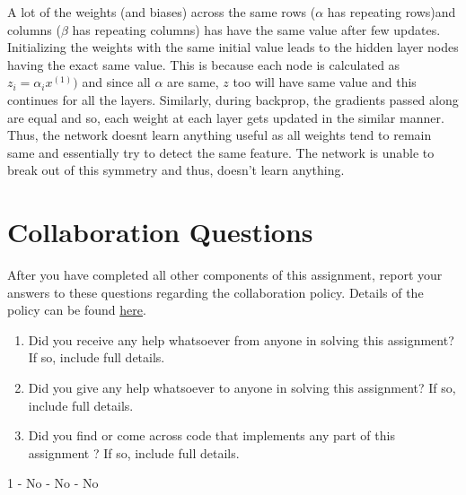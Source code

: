 \documentclass[11pt,addpoints,answers]{exam}
\begin{document}
\begin{questions}
\begin{parts}
\begin{your_solution}[title=Answer,height=5cm,width=14.5cm]
\vspace{-3pt}
A lot of the weights (and biases) across the same rows ($\alpha$ has repeating rows)and columns ($\beta$ has repeating columns) has  have the same value after few updates. Initializing the weights with the same initial value leads to the hidden layer nodes having the exact same value. This is because each node is calculated as $z_i = \alpha_i x^{(1)})$ and since all $\alpha$ are same, $z$ too will have same value and this continues for all the layers. Similarly, during backprop, the gradients passed along are equal and so, each weight at each layer gets updated in the similar manner. Thus, the network doesnt learn anything useful as all weights tend to remain same and essentially try to detect the same feature. The network is unable to break out of this symmetry and thus, doesn't learn anything.
\end{your_solution}

\end{parts}

\end{questions}



\newpage

\section{Collaboration Questions}
After you have completed all other components of this assignment, report your answers to these questions regarding the collaboration policy. Details of the policy can be found \href{http://www.cs.cmu.edu/~mgormley/courses/10601/syllabus.html}{here}.
\begin{enumerate}
    \item Did you receive any help whatsoever from anyone in solving this assignment? If so, include full details.
    \item Did you give any help whatsoever to anyone in solving this assignment? If so, include full details.
    \item Did you find or come across code that implements any part of this assignment ? If so, include full details.
\end{enumerate}

\begin{your_solution}[height=6cm]
1 - No  - No  - No \newline
\end{your_solution}
\end{document}
